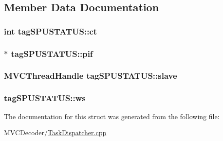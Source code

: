 \subsection{Member Data Documentation}
\hypertarget{structtag_s_p_u_s_t_a_t_u_s_a0bac74b04f7e69e9a129f08ed21894dd}{
\subsubsection[{ct}]{\setlength{\rightskip}{0pt plus 5cm}int {\bf tagSPUSTATUS::ct}}}
\label{structtag_s_p_u_s_t_a_t_u_s_a0bac74b04f7e69e9a129f08ed21894dd}
\hypertarget{structtag_s_p_u_s_t_a_t_u_s_a06878bf12155793c0264fd8e3ca8a4c8}{
\subsubsection[{pif}]{$\ast$ {\bf tagSPUSTATUS::pif}}}
\label{structtag_s_p_u_s_t_a_t_u_s_a06878bf12155793c0264fd8e3ca8a4c8}
\hypertarget{structtag_s_p_u_s_t_a_t_u_s_a527110a06626a2918c8f2129daafae57}{
\subsubsection[{slave}]{\setlength{\rightskip}{0pt plus 5cm}MVCThreadHandle {\bf tagSPUSTATUS::slave}}}
\label{structtag_s_p_u_s_t_a_t_u_s_a527110a06626a2918c8f2129daafae57}
\hypertarget{structtag_s_p_u_s_t_a_t_u_s_af1a501a3875c176bf169bcb8fbedf2bf}{
\subsubsection[{ws}]{ {\bf tagSPUSTATUS::ws}}}
\label{structtag_s_p_u_s_t_a_t_u_s_af1a501a3875c176bf169bcb8fbedf2bf}


The documentation for this struct was generated from the following file:\begin{DoxyCompactItemize}
\item 
MVCDecoder/\hyperlink{_task_dispatcher_8cpp}{TaskDispatcher.cpp}\end{DoxyCompactItemize}
